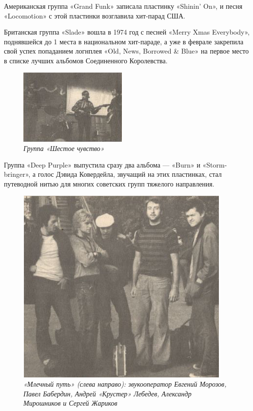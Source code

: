 \documentclass[16pt,a5paper,oneside]{book}
\begin{document}
Американская группа «Grand Funk» записала пластинку «Shinin' On», и песня «Locomotion» с этой пластинки возглавила
хит-парад США.

Британская группа «Slade» вошла в 1974 год с песней «Merry Xmas Everybody», поднявшейся до 1 места в национальном
хит-параде, а уже в феврале закрепила свой успех попаданием логнплея «Old, News, Borrowed \& Blue» на первое место в
списке лучших альбомов Соединенного Королевства.

\begin{figure}
    \centering
    \includegraphics[scale=0.8]{Image03}
    \caption{\textit{Группа «Шестое чувство»}}
\end{figure}

Группа «Deep Purple» выпустила сразу два альбома — «Burn» и «Storm-bringer», а голос Дэвида Ковердейла, звучащий на этих
пластинках, стал путеводной нитью для многих советских групп тяжелого направления.

\begin{figure}
    \centering
    \includegraphics[scale=0.9]{Image04}
    \caption{\textit{
        «Млечный путь» (слева направо): звукооператор Евгений Морозов, Павел Бабердин, Андрей «Крустер» Лебедев,
        Александр Мирошников и Сергей Жариков
    }}
\end{figure}
\end{document}

